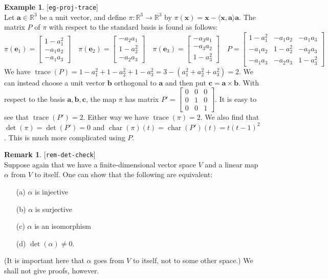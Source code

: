 \documentclass{amsart}
\newcommand{\lbl}[1]{\label{#1}\textup{[\texttt{#1}]}\ \\}
\newcommand{\lbl}{\label}
\newcommand{\R}         {{\mathbb{R}}}
\newcommand{\trc}       {\operatorname{trace}}
\newcommand{\chr}       {\operatorname{char}}
\newcommand{\bsm}       {\left[\begin{smallmatrix}}
\newcommand{\esm}       {\end{smallmatrix}\right]}
\newcommand{\al}        {\alpha}
\newcommand{\tm}        {\times}
\newcommand{\xra}       {\xrightarrow}
\newcommand{\ip}[1]     {\langle #1\rangle}
\newcommand{\va}        {\mathbf{a}}
\newcommand{\vb}        {\mathbf{b}}
\newcommand{\vc}        {\mathbf{c}}
\newcommand{\ve}        {\mathbf{e}}
\newcommand{\vx}        {\mathbf{x}}
\renewcommand{\:}       {\colon}
\theoremstyle{definition}
\newtheorem{remark}[theorem]{Remark}
\newtheorem{example}[theorem]{Example}
\begin{document}
\begin{example}\lbl{eg-proj-trace}
 Let $\va\in\R^3$ be a unit vector, and define
 $\pi\:\R^3\xra{}\R^3$ by $\pi(\vx)=\vx-\ip{\vx,\va}\va$.  {The
 matrix $P$ of $\pi$ with respect to the standard basis is found
 as follows: 
 {\tiny \[ \pi(\ve_1)=\bsm 1-a_1^2\\-a_1a_2\\-a_1a_3\esm\hspace{1em}
    \pi(\ve_2)=\bsm -a_2a_1\\1-a_2^2\\ -a_2a_3\esm\hspace{1em}
    \pi(\ve_3)=\bsm -a_3a_1\\-a_3a_2\\ 1-a_3^2\esm\hspace{1em}
    P = \bsm 1-a_1^2&-a_1a_2&-a_1a_3 \\ 
             -a_1a_2&1-a_2^2&-a_2a_3 \\ 
             -a_1a_3&-a_2a_3&1-a_3^2\esm
 \]}}
 {We have $\trc(P)=1-a_1^2+1-a_2^2+1-a_3^2=3-(a_1^2+a_2^2+a_3^2)=2$.} 
 {We can instead choose a unit vector $\vb$ orthogonal
 to $\va$ and then put $\vc=\va\tm\vb$.}{  With respect to the
 basis $\va,\vb,\vc$, the map $\pi$ has matrix
 $P'=\bsm 0&0&0\\0&1&0\\0&0&1\esm$.}{  It is easy to see that
 $\trc(P')=2$.}{  Either way we have
 $\trc(\pi)=2$.}{  We also find that
 $\det(\pi)=\det(P')=0$ and
 $\chr(\pi)(t)=\chr(P')(t)=t(t-1)^2$.}{  This is much more
 complicated using $P$.}
\end{example}

\begin{remark}\lbl{rem-det-check}
 Suppose again that we have a finite-dimensional vector
 space $V$ and a linear map $\al$ from $V$ to itself.  One
 can show that the following are equivalent:
 \begin{itemize}
  \item[(a)] $\al$ is injective
  \item[(b)] $\al$ is surjective
  \item[(c)] $\al$ is an isomorphism
  \item[(d)] $\det(\al)\neq 0$.
 \end{itemize}
 (It is important here that $\al$ goes from $V$ to itself,
 not to some other space.)  We shall not give proofs,
 however. 
\end{remark}

\end{document}
